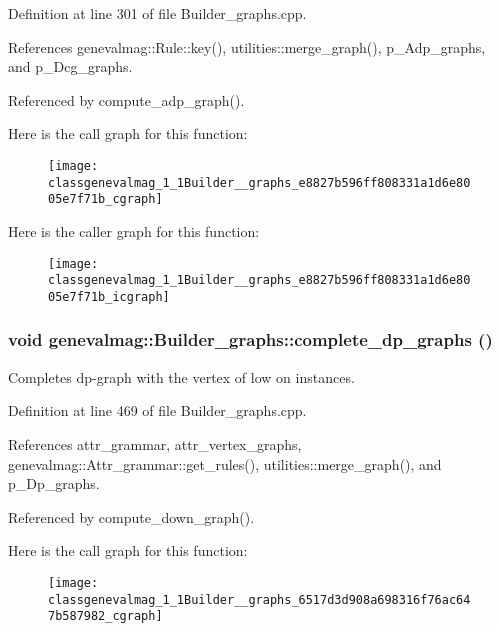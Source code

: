 Definition at line 301 of file Builder\_\-graphs.cpp.

References genevalmag::Rule::key(), utilities::merge\_\-graph(), p\_\-Adp\_\-graphs, and p\_\-Dcg\_\-graphs.

Referenced by compute\_\-adp\_\-graph().

Here is the call graph for this function:\nopagebreak
\begin{figure}[H]
\begin{center}
\leavevmode
\texttt{[image: classgenevalmag\_1\_1Builder\_\_graphs\_e8827b596ff808331a1d6e8005e7f71b\_cgraph]}
\end{center}
\end{figure}


Here is the caller graph for this function:\nopagebreak
\begin{figure}[H]
\begin{center}
\leavevmode
\texttt{[image: classgenevalmag\_1\_1Builder\_\_graphs\_e8827b596ff808331a1d6e8005e7f71b\_icgraph]}
\end{center}
\end{figure}
\hypertarget{classgenevalmag_1_1Builder__graphs_6517d3d908a698316f76ac647b587982}{
\subsubsection[{complete\_\-dp\_\-graphs}]{\setlength{\rightskip}{0pt plus 5cm}void genevalmag::Builder\_\-graphs::complete\_\-dp\_\-graphs ()}}
\label{classgenevalmag_1_1Builder__graphs_6517d3d908a698316f76ac647b587982}


Completes dp-graph with the vertex of low on instances. 

Definition at line 469 of file Builder\_\-graphs.cpp.

References attr\_\-grammar, attr\_\-vertex\_\-graphs, genevalmag::Attr\_\-grammar::get\_\-rules(), utilities::merge\_\-graph(), and p\_\-Dp\_\-graphs.

Referenced by compute\_\-down\_\-graph().

Here is the call graph for this function:\nopagebreak
\begin{figure}[H]
\begin{center}
\leavevmode
\texttt{[image: classgenevalmag\_1\_1Builder\_\_graphs\_6517d3d908a698316f76ac647b587982\_cgraph]}
\end{center}
\end{figure}


